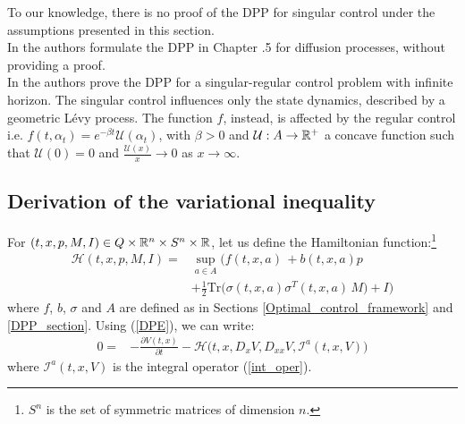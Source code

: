 To our knowledge, there is no proof of the DPP for singular control under the assumptions presented in this section. \\
In \cite{FlemingSoner} the authors formulate the DPP in Chapter .5 for diffusion processes, without providing a proof.\\ 
In \cite{Kab16} the authors prove the DPP for a singular-regular control problem with infinite horizon. 
The singular control influences only the state dynamics, described by a geometric Lévy process. The function $f$, instead, is affected by the regular control i.e. 
$f(t,\alpha_t) = e^{-\beta t} \mathcal{U}(\alpha_t)$, with $\beta>0$ and $\mathcal{U} : A \to \mathbb{R}^+$ a concave function such that $\mathcal{U}(0)=0$ and 
$\frac{\mathcal{U}(x)}{x}\to 0$ as $x\to \infty$.\\


\subsection{Derivation of the variational inequality}\label{singular_sec1}


For $(t,x,p,M,I) \in Q \times \mathbb{R}^n \times S^n \times \mathbb{R}$, let us define the Hamiltonian function:\footnote{$S^n$ is the set of symmetric matrices of dimension $n$.}
\begin{align}\label{Hamiltonian}
 \mathcal{H}(t,x,p,M,I) =& \sup_{a \in A} \biggl( f(t,x,a) \, + b(t,x,a) p \\ \nonumber
              &+ \frac{1}{2} \mbox{Tr} \bigl( \sigma(t,x,a)\sigma^T(t,x,a) \, M \bigr) +I \biggr) 
\end{align}
where $f$, $b$, $\sigma$ and $A$ are defined as in Sections \ref{Optimal_control_framework} and \ref{DPP_section}.
Using (\ref{DPE}), we can write:
\begin{align} \nonumber
 0 = & - \frac{\partial V(t,x)}{\partial t} - \mathcal{H}\bigl( t,x,D_x V, D_{xx} V, \mathcal{I}^a(t,x,V) \bigr) 
\end{align}
where $\mathcal{I}^a(t,x,V)$ is the integral operator (\ref{int_oper}).


